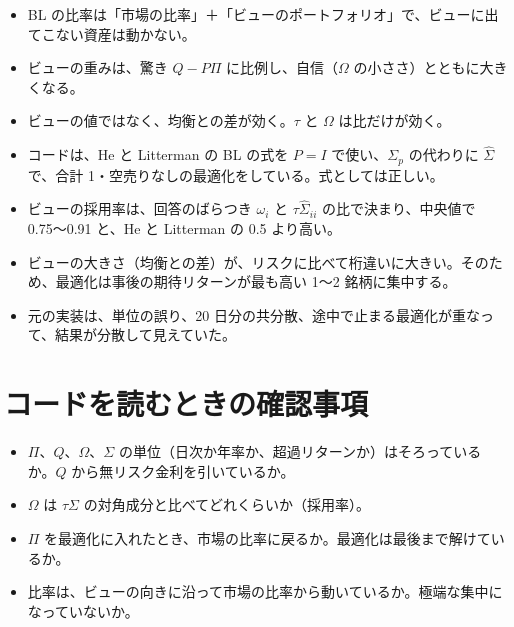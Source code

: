 \documentclass[xelatex,ja=standard,jafont=hiragino-pron,a4paper,11pt,openany]{bxjsreport}
\newcommand{\Sp}{\Sigma_{p}}
\begin{document}
\begin{keybox}
\begin{itemize}
\item BL の比率は「市場の比率」＋「ビューのポートフォリオ」で、ビューに出てこない資産は動かない。
\item ビューの重みは、驚き $Q - P\Pi$ に比例し、自信（$\Omega$ の小ささ）とともに大きくなる。
\item ビューの値ではなく、均衡との差が効く。$\tau$ と $\Omega$ は比だけが効く。
\end{itemize}
\end{keybox}

\begin{keybox}[本プロジェクトの計算について分かること]
\begin{itemize}
\item コードは、He と Litterman の BL の式を $P = I$ で使い、$\Sp$ の代わりに $\hat\Sigma$ で、合計 1・空売りなしの最適化をしている。式としては正しい。
\item ビューの採用率は、回答のばらつき $\omega_i$ と $\tau\hat\Sigma_{ii}$ の比で決まり、中央値で 0.75〜0.91 と、He と Litterman の 0.5 より高い。
\item ビューの大きさ（均衡との差）が、リスクに比べて桁違いに大きい。そのため、最適化は事後の期待リターンが最も高い 1〜2 銘柄に集中する。
\item 元の実装は、単位の誤り、20 日分の共分散、途中で止まる最適化が重なって、結果が分散して見えていた。
\end{itemize}
\end{keybox}

\section*{コードを読むときの確認事項}

\begin{itemize}\small
\item $\Pi$、$Q$、$\Omega$、$\Sigma$ の単位（日次か年率か、超過リターンか）はそろっているか。$Q$ から無リスク金利を引いているか。
\item $\Omega$ は $\tau\Sigma$ の対角成分と比べてどれくらいか（採用率）。
\item $\Pi$ を最適化に入れたとき、市場の比率に戻るか。最適化は最後まで解けているか。
\item 比率は、ビューの向きに沿って市場の比率から動いているか。極端な集中になっていないか。
\end{itemize}
\end{document}
